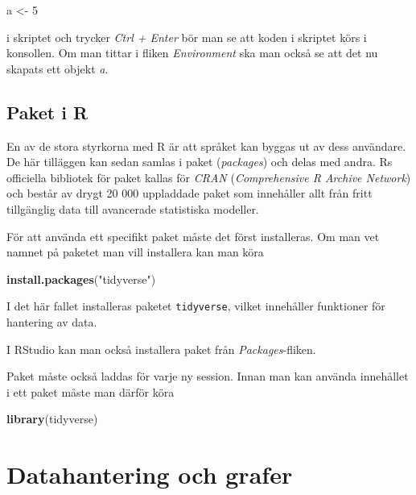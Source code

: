 \documentclass[
]{book}
\newenvironment{Shaded}{\begin{snugshade}}{\end{snugshade}}
\newcommand{\DecValTok}[1]{\textcolor[rgb]{0.00,0.00,0.81}{#1}}
\newcommand{\FunctionTok}[1]{\textcolor[rgb]{0.13,0.29,0.53}{\textbf{#1}}}
\newcommand{\NormalTok}[1]{#1}
\newcommand{\OtherTok}[1]{\textcolor[rgb]{0.56,0.35,0.01}{#1}}
\newcommand{\StringTok}[1]{\textcolor[rgb]{0.31,0.60,0.02}{#1}}
\theoremstyle{definition}
\theoremstyle{definition}
\theoremstyle{definition}
\theoremstyle{definition}
\theoremstyle{remark}
\begin{document}
\begin{Shaded}
\begin{Highlighting}[]
\NormalTok{a }\OtherTok{\textless{}{-}} \DecValTok{5}
\end{Highlighting}
\end{Shaded}

i skriptet och trycker \emph{Ctrl + Enter} bör man se att koden i skriptet körs i konsollen. Om man tittar i fliken \emph{Environment} ska man också se att det nu skapats ett objekt \emph{a}.

\hypertarget{paket-i-r}{%
\section{Paket i R}\label{paket-i-r}}

En av de stora styrkorna med R är att språket kan byggas ut av dess användare. De här tilläggen kan sedan samlas i paket (\emph{packages}) och delas med andra. Rs officiella bibliotek för paket kallas för \emph{CRAN} (\emph{Comprehensive R Archive Network}) och består av drygt 20 000 uppladdade paket som innehåller allt från fritt tillgänglig data till avancerade statistiska modeller.

För att använda ett specifikt paket måste det först installeras. Om man vet namnet på paketet man vill installera kan man köra

\begin{Shaded}
\begin{Highlighting}[]
\FunctionTok{install.packages}\NormalTok{(}\StringTok{"tidyverse"}\NormalTok{)}
\end{Highlighting}
\end{Shaded}

I det här fallet installeras paketet \texttt{tidyverse}, vilket innehåller funktioner för hantering av data.

I RStudio kan man också installera paket från \emph{Packages}-fliken.

Paket måste också laddas för varje ny session. Innan man kan använda innehållet i ett paket måste man därför köra

\begin{Shaded}
\begin{Highlighting}[]
\FunctionTok{library}\NormalTok{(tidyverse)}
\end{Highlighting}
\end{Shaded}

\hypertarget{datahantering-och-grafer}{%
\chapter{Datahantering och grafer}\label{datahantering-och-grafer}}
\end{document}
